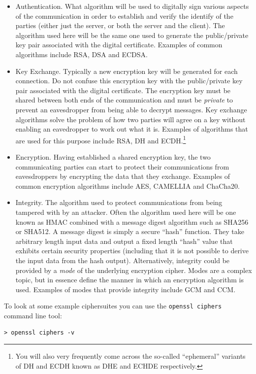 \begin{itemize}
\item Authentication. What algorithm will be used to digitally sign various 
aspects of the communication in order to establish and verify the identify of
the parties (either just the server, or both the server and the client). The 
algorithm used here will be the same one used to generate the public/private 
key pair associated with the digital certificate. Examples of common algorithms 
include RSA, DSA and ECDSA.
\item Key Exchange. Typically a new encryption key will be generated for each
connection. Do not confuse this encryption key with the public/private key pair
associated with the digital certificate. The encryption key must be shared
between both ends of the communication and must be \emph{private} to prevent an
eavesdropper from being able to decrypt messages. Key exchange algorithms solve 
the problem of how two parties will agree on a key without enabling an 
eavedropper to work out what it is. Examples of algorithms that are used for 
this purpose include RSA, DH and ECDH.\footnote{You will also very
frequently come across the so-called ``ephemeral'' variants of DH and ECDH
known as DHE and ECHDE respectively.}
\item Encryption. Having established a shared encryption key, the two 
communicating parties can start to protect their communications from 
eavesdroppers by encrypting the data that they exchange. Examples of common 
encryption algorithms include AES, CAMELLIA and ChaCha20.
\item Integrity. The algorithm used to protect communications from being 
tampered with by an attacker. Often the algorithm used here will be one known 
as HMAC combined with a message digest algorithm such as SHA256 or SHA512. A
message digest is simply a secure ``hash'' function. They take arbitrary 
length input data and output a fixed length ``hash'' value that exhibits 
certain security properties (including that it is not possible to derive the 
input data from the hash output). Alternatively, integrity could be provided by
a \emph{mode} of the underlying  encryption cipher. Modes are a complex topic,
but in essence define the manner in which an encryption algorithm is used.
Examples of modes that provide integrity include GCM and CCM.
\end{itemize}

To look at some example ciphersuites you can use the \lstinline!openssl ciphers!
command line tool:
\begin{lstlisting}[caption=Showing the openssl DEFAULT ciphersuites]
> openssl ciphers -v
\end{lstlisting}

